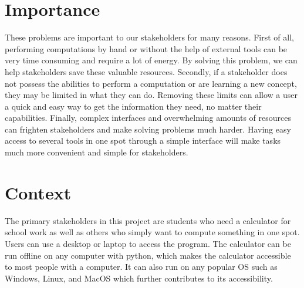 \documentclass[12pt]{article}
\begin{document}
\section*{Importance}
These problems are important to our stakeholders for many reasons. First of all, performing computations by hand or without the help of external tools can be very time consuming and require a lot of energy. By solving this problem, we can help stakeholders save these valuable resources. Secondly, if a stakeholder does not possess the abilities to perform a computation or are learning a new concept, they may be limited in what they can do. Removing these limits can allow a user a quick and easy way to get the information they need, no matter their capabilities. Finally, complex interfaces and overwhelming amounts of resources can frighten stakeholders and make solving problems much harder. Having easy access to several tools in one spot through a simple interface will make tasks much more convenient and simple for stakeholders.

\section*{Context}
The primary stakeholders in this project are students who need a calculator for school work as well as others who simply want to compute something in one spot. Users can use a desktop or laptop to access the program. The calculator can be run offline on any computer with python, which makes the calculator accessible to most people with a computer. It can also run on any popular OS such as Windows, Linux, and MacOS which further contributes to its accessibility.
\end{document}
